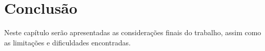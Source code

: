 \chapter{Conclusão}

Neste capítulo serão apresentadas as considerações finais do trabalho, assim como
as limitações e dificuldades encontradas.